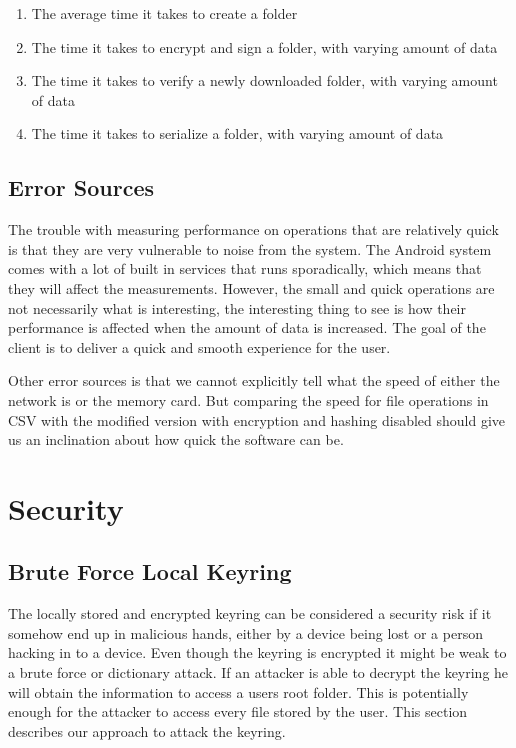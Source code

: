 \documentclass[pdftex,english,10pt,b5paper,twoside]{book}
\begin{document}
\begin{enumerate}
    \item The average time it takes to create a folder
    \item The time it takes to encrypt and sign a folder, with varying amount
    of data
    \item The time it takes to verify a newly downloaded folder, with varying
    amount of data
    \item The time it takes to serialize a folder, with varying amount of data
\end{enumerate}

\subsection{Error Sources}
The trouble with measuring performance on operations that are relatively quick
is that they are very vulnerable to noise from the system. The Android system
comes with a lot of built in services that runs sporadically, which means that
they will affect the measurements. However, the small and quick operations are
not necessarily what is interesting, the interesting thing to see is how their
performance is affected when the amount of data is increased. The goal of the
client is to deliver a quick and smooth experience for the user.

Other error sources is that we cannot explicitly tell what the speed of either
the network is or the memory card. But comparing the speed for file operations
in CSV with the modified version with encryption and hashing disabled should
give us an inclination about how quick the software can be.
\section{Security}

\subsection{Brute Force Local Keyring} \label{sec:BFLK} The locally stored and
encrypted keyring can be considered a security risk if it somehow end up in
malicious hands, either by a device being lost or a person hacking in to a
device. Even though the keyring is encrypted it might be weak to a brute force
or dictionary attack. If an attacker is able to decrypt the keyring he will
obtain the information to access a users root folder. This is potentially
enough for the attacker to access every file stored by the user. This section
describes our approach to attack the keyring.
\end{document}
